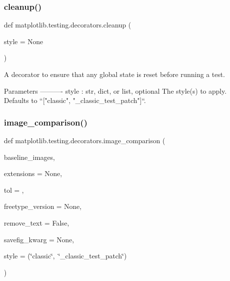\mbox{\label{namespacematplotlib_1_1testing_1_1decorators_aca4dda0538e182fbc9232ef377fba97d}} 
\subsubsection{\texorpdfstring{cleanup()}{cleanup()}}
{\footnotesize\ttfamily def matplotlib.\+testing.\+decorators.\+cleanup (\begin{DoxyParamCaption}\item[{}]{style = {\ttfamily None} }\end{DoxyParamCaption})}

\begin{DoxyVerb}A decorator to ensure that any global state is reset before
running a test.

Parameters
----------
style : str, dict, or list, optional
    The style(s) to apply.  Defaults to ``["classic",
    "_classic_test_patch"]``.
\end{DoxyVerb}
 \mbox{\label{namespacematplotlib_1_1testing_1_1decorators_ac21f58ae7b14bdc094ee33a58d743bfc}} 
\subsubsection{\texorpdfstring{image\+\_\+comparison()}{image\_comparison()}}
{\footnotesize\ttfamily def matplotlib.\+testing.\+decorators.\+image\+\_\+comparison (\begin{DoxyParamCaption}\item[{}]{baseline\+\_\+images,  }\item[{}]{extensions = {\ttfamily None},  }\item[{}]{tol = {},  }\item[{}]{freetype\+\_\+version = {\ttfamily None},  }\item[{}]{remove\+\_\+text = {\ttfamily False},  }\item[{}]{savefig\+\_\+kwarg = {\ttfamily None},  }\item[{}]{style = {\ttfamily (\char`\"{}classic\char`\"{},~\char`\"{}\+\_\+classic\+\_\+test\+\_\+patch\char`\"{})} }\end{DoxyParamCaption})}

